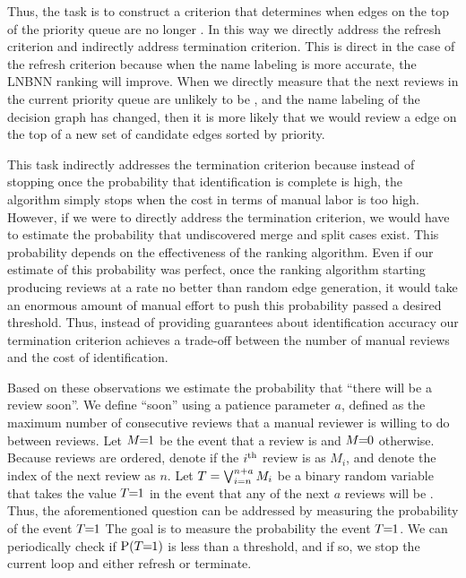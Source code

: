 Thus, the task is to construct a criterion that determines when edges on the top of the priority queue are no
  longer \meaningful{}.
In this way we directly address the refresh criterion and indirectly address termination criterion.
This is direct in the case of the refresh criterion because when the name labeling is more accurate, the LNBNN
  ranking will improve.
When we directly measure that the next reviews in the current priority queue are unlikely to be \meaningful{}, and
  the name labeling of the decision graph has changed, then it is more likely that we would review a \meaningful{}
  edge on the top of a new set of candidate edges sorted by priority.

This task indirectly addresses the termination criterion because instead of stopping once the probability that
  identification is complete is high, the algorithm simply stops when the cost in terms of manual labor is too
  high.
However, if we were to directly address the termination criterion, we would have to estimate the probability that
  undiscovered merge and split cases exist.
This probability depends on the effectiveness of the ranking algorithm.
Even if our estimate of this probability was perfect, once the ranking algorithm starting producing \meaningful{}
  reviews at a rate no better than random edge generation, it would take an enormous amount of manual effort to
  push this probability passed a desired threshold.
Thus, instead of providing guarantees about identification accuracy our termination criterion achieves a
  trade-off between the number of manual reviews and the cost of identification.



Based on these observations we estimate the probability that ``there will be a \meaningful{} review soon''.
We define ``soon'' using a patience parameter $a$, defined as the maximum number of consecutive reviews that a
  manual reviewer is willing to do between \meaningful{} reviews.
Let $M\mkern-6mu=\mkern-6mu1$ be the event that a review is \meaningful{} and $M\mkern-6mu=\mkern-6mu0$ otherwise.
Because reviews are ordered, denote if the $i^{\textrm{th}}$ review is \meaningful{} as $M_i$, and denote the index of the
  next review as $n$.
Let  %
$T = \bigvee_{i=n}^{n+a} M_i$
%
be a binary random variable that takes the value $T\mkern-6mu=\mkern-6mu1$ in the event that any of the next $a$ reviews will be
  \meaningful{}.
Thus, the aforementioned question can be addressed by measuring the probability of the event $T\mkern-6mu=\mkern-6mu1$ The goal is
  to measure the probability the event $T\mkern-6mu=\mkern-6mu1$.
We can periodically check if $\mathbin{\operatorname{P}}(T\mkern-6mu=\mkern-6mu1)$ is less than a threshold, and if so, we stop the current loop and
  either refresh or terminate.

